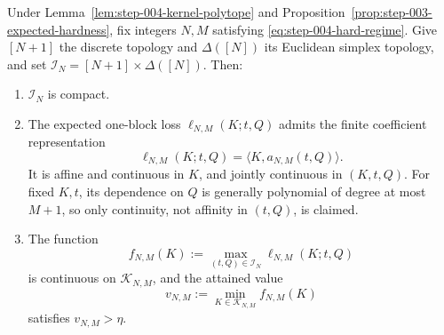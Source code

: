 \begin{lemma}\label{lem:step-004-payoff-value}
Under Lemma~\ref{lem:step-004-kernel-polytope} and Proposition~\ref{prop:step-003-expected-hardness}, fix integers
\(N,M\) satisfying \eqref{eq:step-004-hard-regime}. Give \([N+1]\) the discrete
topology and \(\Delta([N])\) its Euclidean simplex topology, and set
\(\mathcal I_N=[N+1]\times\Delta([N])\). Then:

\begin{enumerate}
\item \(\mathcal I_N\) is compact.
\item The expected one-block loss \(\ell_{N,M}(K;t,Q)\) admits the finite
   coefficient representation
   \[
   \ell_{N,M}(K;t,Q)=\langle K,a_{N,M}(t,Q)\rangle.
   \]
   It is affine and
   continuous in \(K\), and jointly continuous in \((K,t,Q)\). For fixed
   \(K,t\), its dependence on \(Q\) is generally polynomial of degree at
   most \(M+1\), so only continuity, not affinity in \((t,Q)\), is claimed.
\item The function
   \[
   f_{N,M}(K):=\max_{(t,Q)\in\mathcal I_N}
      \ell_{N,M}(K;t,Q)
   \]
   is continuous on \(\mathcal K_{N,M}\), and the attained value
   \[
   v_{N,M}:=\min_{K\in\mathcal K_{N,M}}f_{N,M}(K)
   \tag{S4.8}\label{eq:step-004-8}
   \]
   satisfies \(v_{N,M}>\eta\).
\end{enumerate}
\end{lemma}

